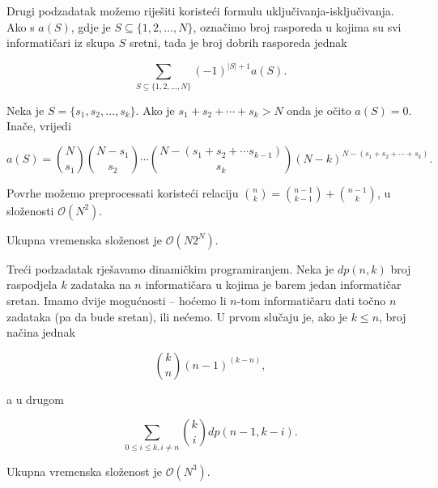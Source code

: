 \documentclass[a4paper]{article}
\begin{document}
Drugi podzadatak možemo riješiti koristeći formulu uključivanja-isključivanja.
Ako s $a(S)$, gdje je $S \subseteq \{1, 2, \ldots, N\}$, označimo broj rasporeda
u kojima su svi informatičari iz skupa $S$ sretni, tada je broj dobrih
rasporeda jednak

$$\sum_{S \subseteq \{1, 2, \ldots, N\}}{(-1)^{|S| + 1} a(S)}.$$

Neka je $S = \{s_1, s_2, \ldots, s_k\}$. Ako je $s_1 + s_2 + \cdots + s_k > N$
onda je očito $a(S) = 0$. Inače, vrijedi 

$$a(S) = \binom{N}{s_1} \binom{N - s_1}{s_2} \cdots \binom{N - (s_1 + s_2 +
\cdots s_{k-1})}{s_k} (N - k)^{N - (s_1 + s_2 + \cdots + s_k)}.$$

Povrhe možemo preprocessati koristeći relaciju $\binom{n}{k} = \binom{n - 1}{k
- 1} + \binom{n - 1}{k}$, u složenosti $\mathcal{O}(N^2)$.

Ukupna vremenska složenost je $\mathcal{O}(N 2^N)$.

Treći podzadatak rješavamo dinamičkim programiranjem. Neka je $dp(n, k)$ broj
raspodjela $k$ zadataka na $n$ informatičara u kojima je barem jedan informatičar
sretan. Imamo dvije mogućnosti -- hoćemo li $n$-tom informatičaru dati točno $n$
zadataka (pa da bude sretan), ili nećemo. U prvom slučaju je, ako je $k \leq n$,
broj načina jednak

$$\binom{k}{n} (n - 1)^{(k - n)},$$

a u drugom

$$\sum_{0 \leq i \leq k, i \neq n}{\binom{k}{i} dp(n - 1, k - i)}.$$

Ukupna vremenska složenost je $\mathcal{O}(N^3)$.
\end{document}
